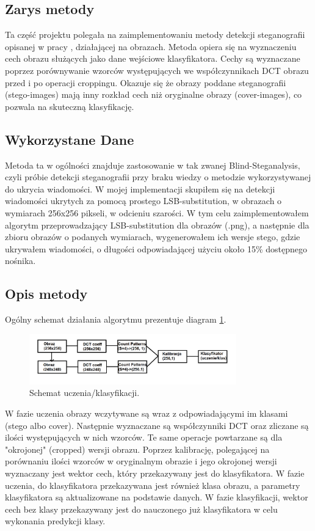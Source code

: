 \subsection{Zarys metody}
Ta część projektu polegała na zaimplementowaniu metody detekcji steganografii opisanej w pracy \cite{dct_match_article}, działającej na obrazach. Metoda opiera się na wyznaczeniu cech obrazu służących jako dane wejściowe klasyfikatora. Cechy są wyznaczane poprzez porównywanie wzorców występujących we współczynnikach DCT obrazu przed i po operacji croppingu. Okazuje się że obrazy poddane steganografii (stego-images) mają inny rozkład cech niż oryginalne obrazy (cover-images), co pozwala na skuteczną klasyfikację.\\

\subsection{Wykorzystane Dane}
Metoda ta w ogólności znajduje zastosowanie w tak zwanej Blind-Steganalysis, czyli próbie detekcji steganografii przy braku wiedzy o metodzie wykorzystywanej do ukrycia wiadomości. W mojej implementacji skupiłem się na detekcji wiadomości ukrytych za pomocą prostego LSB-substitution, w obrazach o wymiarach 256x256 pikseli, w odcieniu szarości. W tym celu zaimplementowałem algorytm przeprowadzający LSB-substitution dla obrazów (.png), a następnie dla zbioru obrazów o podanych wymiarach, wygenerowałem ich wersje stego, gdzie ukrywałem wiadomości, o długości odpowiadającej użyciu około 15\% dostępnego nośnika.\\

\subsection{Opis metody}
Ogólny schemat działania algorytmu prezentuje diagram \ref{fig:dct_match_scheme}.
\begin{figure}[ht!]
	\centering
	\includegraphics[width=0.8\textwidth]{./img/dct_match_scheme.png}
	\caption{\label{fig:dct_match_scheme} Schemat uczenia/klasyfikacji.}
\end{figure}

W fazie uczenia obrazy wczytywane są wraz z odpowiadającymi im klasami (stego albo cover). Następnie wyznaczane są współczynniki DCT oraz zliczane są ilości występujących w nich wzorców. Te same operacje powtarzane są dla "okrojonej" (cropped) wersji obrazu. Poprzez kalibrację, polegającej na porównaniu ilości wzorców w oryginalnym obrazie i jego okrojonej wersji wyznaczany jest wektor cech, który przekazywany jest do klasyfikatora. W fazie uczenia, do klasyfikatora przekazywana jest również klasa obrazu, a parametry klasyfikatora są aktualizowane na podstawie danych. W fazie klasyfikacji, wektor cech bez klasy przekazywany jest do nauczonego już klasyfikatora w celu wykonania predykcji klasy.\\


